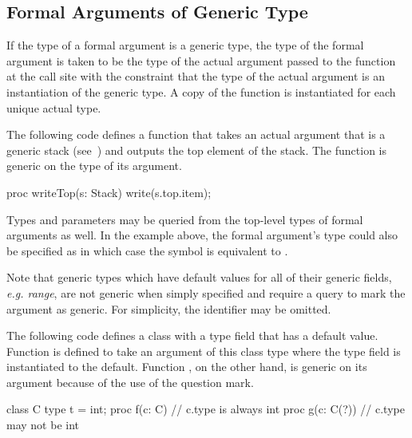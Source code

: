 \subsection{Formal Arguments of Generic Type}
\label{Formal_Arguments_of_Generic_Type}

If the type of a formal argument is a generic type, the type of the
formal argument is taken to be the type of the actual argument passed
to the function at the call site with the constraint that the type of
the actual argument is an instantiation of the generic type.  A copy
of the function is instantiated for each unique actual type.
\begin{example}
The following code defines a function  that takes an
actual argument that is a generic stack
(see~) and outputs the top element of the
stack.  The function is generic on the type of its argument.
\begin{chapel}
proc writeTop(s: Stack) {
  write(s.top.item);
}
\end{chapel}
\end{example}

Types and parameters may be queried from the top-level types of formal
arguments as well.  In the example above, the formal argument's type
could also be specified as  in which case the
symbol  is equivalent to .

Note that generic types which have default values for all of their
generic fields, \emph{e.g. range}, are not generic when simply
specified and require a query to mark the argument as generic.  For
simplicity, the identifier may be omitted.
\begin{example}
The following code defines a class with a type field that has a
default value.  Function  is defined to take an argument of
this class type where the type field is instantiated to the default.
Function , on the other hand, is generic on its argument
because of the use of the question mark.
\begin{chapel}
class C {
  type t = int;
}
proc f(c: C) {
  // c.type is always int
}
proc g(c: C(?)) {
  // c.type may not be int
}
\end{chapel}
\end{example}

